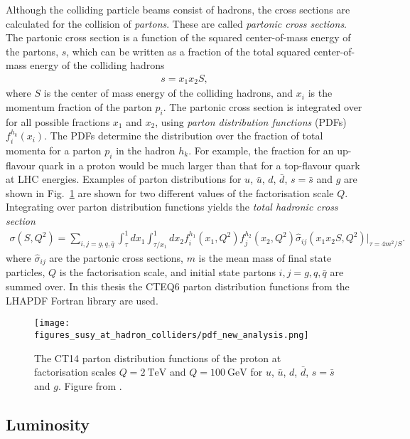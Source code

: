 \documentclass[twoside,english]{uiofysmaster}
\begin{document}
{Although the colliding particle beams consist of hadrons, the cross sections are calculated for the collision of \textit{partons}. These are called \textit{partonic cross sections}. The partonic cross section is a function of the squared center-of-mass energy of the partons, $s$, which can be written as a fraction of the total squared center-of-mass energy of the colliding hadrons
\begin{align}
s = x_1 x_2 S,
\end{align}
where $S$ is the center of mass energy of the colliding hadrons, and $x_i$ is the momentum fraction of the parton $p_i$. The partonic cross section is integrated over for all possible fractions $x_1$ and $x_2$, using \textit{parton distribution functions} (PDFs) $f_i^{h_k}(x_i)$. The PDFs determine the distribution over the fraction of total momenta for a parton $p_i$ in the hadron $h_k$. For example, the fraction for an up-flavour quark in a proton would be much larger than that for a top-flavour quark at LHC energies. Examples of parton distributions for $u$, $\bar{u}$, $d$, $\bar{d}$, $s=\bar{s}$ and $g$ are shown in Fig.~\ref{Fig:: susy hadron : PDFs} are shown for two different values of the factorisation scale $Q$. Integrating over parton distribution functions yields the \textit{total hadronic cross section}
\begin{align}
\sigma(S, Q^2) = \sum_{i,j=g, q, \bar{q}} \int_{\tau}^1dx_1 \int_{\tau/x_1}^1 dx_2 f_i^{h_1} (x_1, Q^2) f_j^{h_2}(x_2, Q^2) \hat{\sigma}_{ij} (x_1x_2S, Q^2)\Big|_{\tau=4m^2/S}.
\end{align}
where $\hat{\sigma}_{ij}$ are the partonic cross sections, $m$ is the mean mass of final state particles, $Q$ is the factorisation scale, and initial state partons $i,j=g,q, \bar{q}$ are summed over.  In this thesis the CTEQ6 parton distribution functions from the LHAPDF Fortran library \cite{PhysRevD.78.013004} are used. 

\begin{figure}
\centering
\texttt{[image: figures\_susy\_at\_hadron\_colliders/pdf\_new\_analysis.png]}
\caption{The CT14 parton distribution functions of the proton at factorisation scales $Q=2~\mathrm{TeV}$ and $Q=100~\mathrm{GeV}$ for $u$, $\bar{u}$, $d$, $\bar{d}$, $s=\bar{s}$ and $g$.  Figure from \cite{dulat2016new}.}
\label{Fig:: susy hadron : PDFs}
\end{figure}




\subsection{Luminosity}

}
\end{document}
